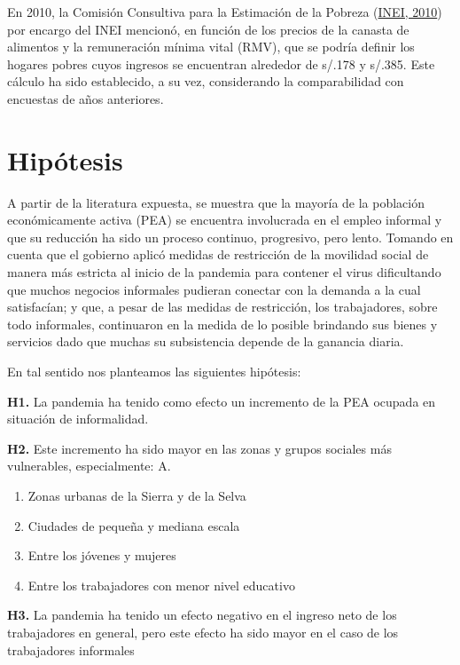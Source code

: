 \documentclass[
  letterpaper,
  12pt,
  oneside,
  spanish,
  doublespacing,
  headsepline,
  parskip]{MastersDoctoralThesis}
\begin{document}
En 2010, la Comisión Consultiva para la Estimación de la Pobreza
(\protect\hyperlink{ref-inei2010}{INEI, 2010}) por encargo del INEI
mencionó, en función de los precios de la canasta de alimentos y la
remuneración mínima vital (RMV), que se podría definir los hogares
pobres cuyos ingresos se encuentran alrededor de s/.178 y s/.385. Este
cálculo ha sido establecido, a su vez, considerando la comparabilidad
con encuestas de años anteriores.


\hypertarget{sec-hipotesis}{%
\chapter{Hipótesis}\label{sec-hipotesis}}

A partir de la literatura expuesta, se muestra que la mayoría de la
población económicamente activa (PEA) se encuentra involucrada en el
empleo informal y que su reducción ha sido un proceso continuo,
progresivo, pero lento. Tomando en cuenta que el gobierno aplicó medidas
de restricción de la movilidad social de manera más estricta al inicio
de la pandemia para contener el virus dificultando que muchos negocios
informales pudieran conectar con la demanda a la cual satisfacían; y
que, a pesar de las medidas de restricción, los trabajadores, sobre todo
informales, continuaron en la medida de lo posible brindando sus bienes
y servicios dado que muchas su subsistencia depende de la ganancia
diaria.

En tal sentido nos planteamos las siguientes hipótesis:

\textbf{H1.} La pandemia ha tenido como efecto un incremento de la PEA
ocupada en situación de informalidad.

\textbf{H2.} Este incremento ha sido mayor en las zonas y grupos
sociales más vulnerables, especialmente: A.

\begin{enumerate}
\def\labelenumi{\roman{enumi}.}
\item
  Zonas urbanas de la Sierra y de la Selva
\item
  Ciudades de pequeña y mediana escala
\item
  Entre los jóvenes y mujeres
\item
  Entre los trabajadores con menor nivel educativo
\end{enumerate}

\textbf{H3.} La pandemia ha tenido un efecto negativo en el ingreso neto
de los trabajadores en general, pero este efecto ha sido mayor en el
caso de los trabajadores informales
\end{document}
